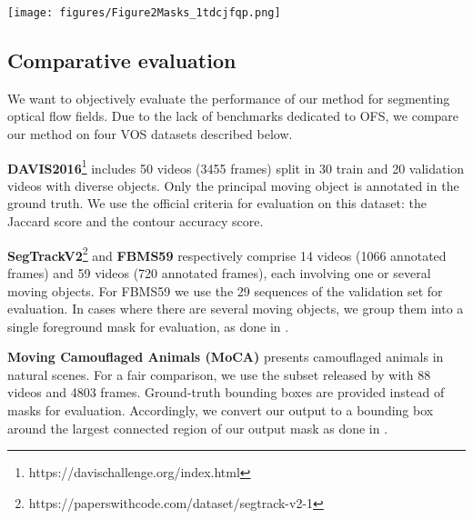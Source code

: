 \documentclass[10pt,twocolumn,letterpaper]{article}
\begin{document}
\begin{figure*}[tbh]
\texttt{[image: figures/Figure2Masks\_1tdcjfqp.png]}
 \vspace{-0.5cm}
\caption{Examples of motion segmentation results obtained with our method with two masks, on the videos bmx-trees, breakdance-flare, scooter-black, kite-surf, blackswan, parkour, dogs02 and cuttlefish 1, of the DAVIS2016, FBMS and MoCA datasets. First row: a frame of the video with the ground-truth superimposed in yellow. Second row: the input flow field displayed with the HSV color code \cite{middlebury} {\color{black} that is depicted in Fig.\ref{fig:flowchart}}. Third row: the segmentation produced by our method superimposed in green on the corresponding image.}
\label{fig:2masks}
 \vspace{-0.15cm}
\end{figure*}

\subsection{Comparative evaluation}
\label{eval}

We want to objectively evaluate the performance of our method for segmenting optical flow fields. Due to the lack of benchmarks dedicated to OFS, we compare our method on four VOS datasets described below.

\textbf{DAVIS2016}\footnote{https://davischallenge.org/index.html} \cite{pont-tuset_benchmark_2016} includes 50 videos (3455 frames) split in 30 train and 20 validation videos with diverse objects. Only the principal moving object is annotated in the ground truth. We use the official criteria for evaluation on this dataset: the Jaccard score and the contour accuracy score.

\textbf{SegTrackV2}\footnote{https://paperswithcode.com/dataset/segtrack-v2-1} \cite{li-SegTrackv2-2013} and \textbf{FBMS59} \cite{ochs2014} respectively comprise 14 videos (1066 annotated frames) and 59 videos (720 annotated frames), each involving one or several moving objects. For FBMS59 we use the 29 sequences of the validation set for evaluation. In cases where there are several moving objects, we group them into a single foreground mask for evaluation, as done in \cite{yang_motion-grouping_2021}.

\textbf{Moving Camouflaged Animals (MoCA)} \cite{lamdouar_camouflage_2020} presents camouflaged animals in natural scenes. For a fair comparison, we use the subset released by \cite{yang_motion-grouping_2021} with 88 videos and 4803 frames. Ground-truth bounding boxes are provided instead of masks for evaluation. Accordingly, we convert our output to a bounding box around the largest connected region of our output mask as done in \cite{yang_motion-grouping_2021}.
\end{document}
